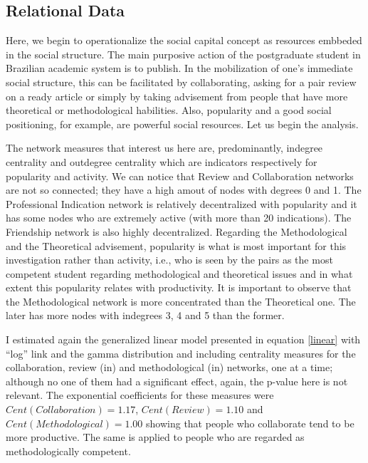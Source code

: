 \documentclass[12pt, english]{article}
\begin{document}
\subsection{Relational Data}

Here, we begin to operationalize the social capital concept as resources embbeded in the social structure. The main purposive action of the postgraduate student in Brazilian academic system is to publish. In the mobilization of one's immediate social structure, this can be facilitated by collaborating, asking for a pair review on a ready article or simply by taking advisement from people that have more theoretical or methodological habilities. Also, popularity and a good social positioning, for example, are powerful social resources. Let us begin the analysis.




The network measures that interest us here are, predominantly, indegree centrality and outdegree centrality which are indicators respectively for popularity and activity. We can notice that Review and Collaboration networks are not so connected; they have a high amout of nodes with degrees 0 and 1. The Professional Indication network is relatively decentralized with popularity and it has some nodes who are extremely active (with more than 20 indications). The Friendship network is also highly decentralized. Regarding the Methodological and the Theoretical advisement, popularity is what is most important for this investigation rather than activity, i.e., who is seen by the pairs as the most competent student regarding methodological and theoretical issues and in what extent this popularity relates with productivity. It is important to observe that the Methodological network is more concentrated than the Theoretical one. The later has more nodes with indegrees 3, 4 and 5 than the former. 

I estimated again the generalized linear model presented in equation \ref{linear} with ``log'' link and the gamma distribution and including centrality measures for the collaboration, review (in) and methodological (in) networks, one at a time; although no one of them had a significant effect, again, the p-value here is not relevant. The exponential coefficients for these measures were $Cent(Collaboration) = 1.17$, $Cent(Review) = 1.10$ and $Cent(Methodological) = 1.00$ showing that people who collaborate tend to be more productive. The same is applied to people who are regarded as methodologically competent.
\end{document}
